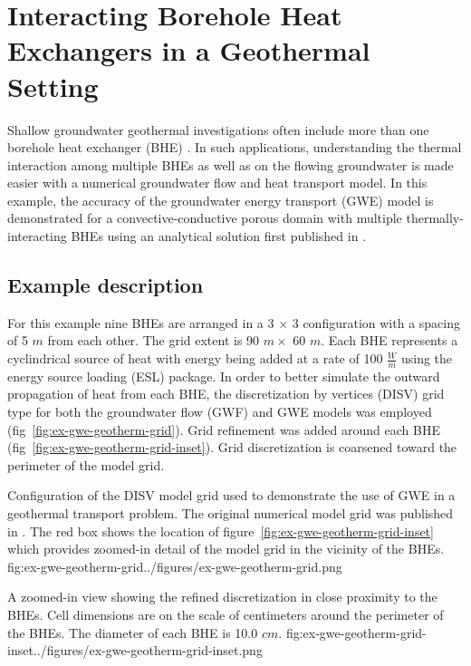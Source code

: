 \section{Interacting Borehole Heat Exchangers in a Geothermal Setting}

Shallow groundwater geothermal investigations often include more than one borehole heat exchanger (BHE) \citep{alKhoury2021}. In such applications, understanding the thermal interaction among multiple BHEs as well as on the flowing groundwater is made easier with a numerical groundwater flow and heat transport model.  In this example, the accuracy of the groundwater energy transport (GWE) model is demonstrated for a convective-conductive porous domain with multiple thermally-interacting BHEs using an analytical solution first published in \cite{alKhoury2021}.  

\subsection{Example description}

For this example nine BHEs are arranged in a 3 $\times$ 3 configuration with a spacing of 5 $m$ from each other. The grid extent is 90 $m \times$ 60 $m$.  Each BHE represents a cyclindrical source of heat with energy being added at a rate of 100 $\tfrac{W}{m}$ using the energy source loading (ESL) package. In order to better simulate the outward propagation of heat from each BHE, the discretization by vertices (DISV) grid type for both the groundwater flow (GWF) and GWE models was employed (fig~\ref{fig:ex-gwe-geotherm-grid}). Grid refinement was added around each BHE (fig~\ref{fig:ex-gwe-geotherm-grid-inset}). Grid discretization is coarsened toward the perimeter of the model grid. 

\begin{StandardFigure}{
    Configuration of the DISV model grid used to demonstrate the use of GWE in a geothermal transport problem.  The original numerical model grid was published in \cite{alKhoury2021}.  The red box shows the location of figure~\ref{fig:ex-gwe-geotherm-grid-inset} which provides zoomed-in detail of the model grid in the vicinity of the BHEs.}
    {fig:ex-gwe-geotherm-grid}{../figures/ex-gwe-geotherm-grid.png}
\end{StandardFigure}            

\begin{StandardFigure}{
    A zoomed-in view showing the refined discretization in close proximity to the BHEs.  Cell dimensions are on the scale of centimeters around the perimeter of the BHEs.  The diameter of each BHE is 10.0 $cm$.}
    {fig:ex-gwe-geotherm-grid-inset}{../figures/ex-gwe-geotherm-grid-inset.png}
\end{StandardFigure}            

